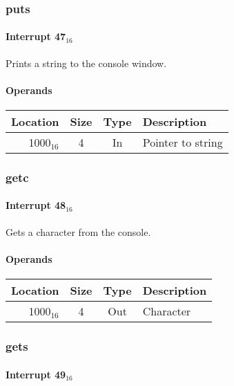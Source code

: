 \documentclass{article}
\begin{document}
\subsubsection{puts}

\paragraph{Interrupt 47$_{16}$}

Prints a string to the console window.

\paragraph{Operands}

\begin{tabular}{|r|c|c|l|}
	\hline
	\textbf{Location} & \textbf{Size} & \textbf{Type} & \textbf{Description} \\
	\hline
	1000$_{16}$ & 4 & In & Pointer to string \\
	\hline
\end{tabular}

\subsubsection{getc}

\paragraph{Interrupt 48$_{16}$}

Gets a character from the console.

\paragraph{Operands}

\begin{tabular}{|r|c|c|l|}
	\hline
	\textbf{Location} & \textbf{Size} & \textbf{Type} & \textbf{Description} \\
	\hline
	1000$_{16}$ & 4 & Out & Character \\
	\hline
\end{tabular}

\subsubsection{gets}

\paragraph{Interrupt 49$_{16}$}
\end{document}
